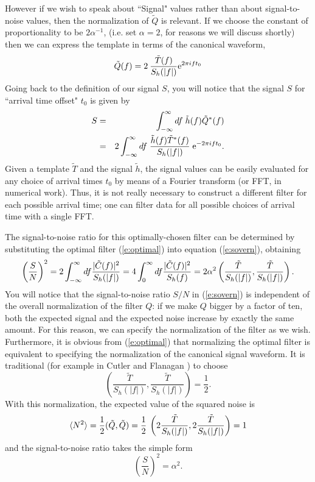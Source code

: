 However if we wish to speak about ``Signal" values rather than about
signal-to-noise values, then the normalization of $\tilde Q$ is relevant.
If we choose the constant of proportionality to be $2 \alpha^{-1}$,
(i.e. set $\alpha = 2$, for reasons we will discuss shortly) then we
can express the template in terms of the canonical waveform,
\begin{equation}
\label{e:optimal}
        \tilde{Q}(f)=2 \> \frac{\tilde{T}(f)}{S_h(|f|)} {\rm e}^{2\pi i f t_0}
\end{equation}
Going back to the definition of our signal $S$, you will notice that the
signal $S$ for ``arrival time offset" $t_0$ is given by
\begin{eqnarray}
\nonumber
S &=& \int_{-\infty}^\infty df \; \tilde h(f) \tilde Q^* (f) \\
\label{e:lag}
  &=& 2 \int_{-\infty}^\infty df \; { \tilde h(f) \tilde T^* (f) 
\over S_h(|f|)} \; {\rm e}^{- 2 \pi i f t_0}.
\end{eqnarray}
Given a template $\tilde T$ and the signal $\tilde h$, the signal
values can be easily evaluated for any choice of arrival times $t_0$ by
means of a Fourier transform (or FFT, in numerical work).  Thus, it is
not really necessary to construct a different filter for each possible
arrival time; one can filter data for all possible choices of arrival
time with a single FFT.

The signal-to-noise ratio for this optimally-chosen filter can be
determined by substituting the optimal filter (\ref{e:optimal}) into
equation (\ref{e:sovern}), obtaining
\begin{equation}
\nonumber
\left( {S \over N} \right)^2 = 
 2 \int_{-\infty}^\infty df {| \tilde C(f) |^2 \over S_h(|f|)} =
 4 \int_{0}^\infty df { | \tilde C(f) |^2 \over S_h(f)} = 2 \alpha^2 
 \left(\frac{\tilde{T}}{S_h(|f|)},\frac{\tilde{T}}{S_h(|f|)}\right).
\end{equation}
You will notice that the signal-to-noise ratio $S/N$ in
(\ref{e:sovern}) is independent of the overall normalization of the
filter $Q$:  if we make $Q$ bigger by a factor of ten, both the
expected signal and the expected noise increase by exactly the same
amount.  For this reason, we can specify the normalization of the 
filter as we wish. Furthermore, it is obvious from (\ref{e:optimal}) 
that normalizing the optimal filter is equivalent to specifying the
normalization of the canonical signal waveform. It is traditional
(for example in Cutler and Flanagan \cite{cutler:1994})
to choose 
\begin{equation}
\label{e:cfnorm}
   \left(\frac{\tilde{T}}{S_h(|f|)},\frac{\tilde{T}}{S_h(|f|)}
   \right)=\frac{1}{2}.
\end{equation}
With this normalization, 
the expected value of the squared noise is
\begin{equation}
\langle N^2 \rangle = {1 \over 2} (\tilde Q,\tilde Q) = {1 \over 2} \>
\left( 2 \frac{\tilde{T}}{S_h(|f|)},2 \frac{\tilde{T}}{S_h(|f|)}
   \right) = 1
\end{equation}
and the signal-to-noise ratio takes the simple form
\begin{equation}
\left(\frac{S}{N}\right)^2 = \alpha^2.
\end{equation}

\newpage
\newpage
\newpage
\newpage
\newpage
